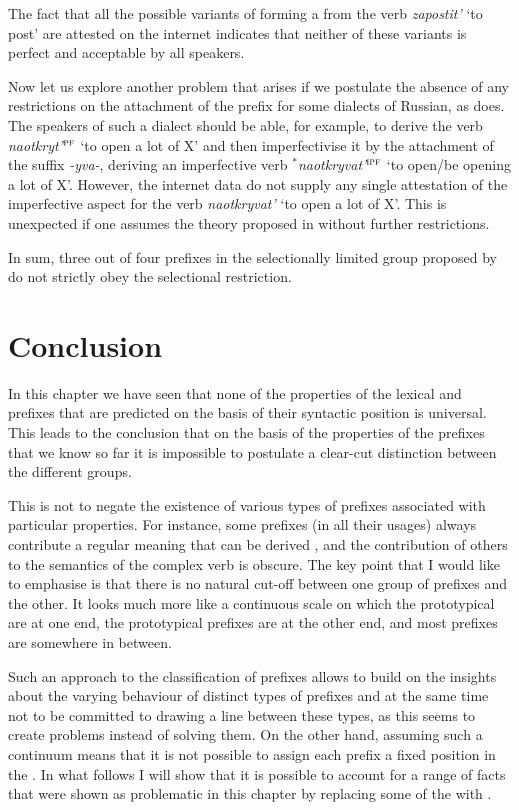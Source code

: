 The fact that all the possible variants of forming a  from the verb \textit{zapostit'} `to post' are attested on the internet indicates that neither of these variants is perfect and acceptable by all speakers.

Now let us explore another problem that arises if we postulate the absence of any restrictions on the attachment of the prefix  for some dialects of Russian, as \citet{Tatevosov:13a} does. The speakers of such a dialect should be able, for example, to derive the verb \textit{naotkryt'}$^{\textsc{pf}}$ `to open a lot of X' and then imperfectivise it by the attachment of the suffix \textit{-yva-}, deriving an imperfective verb $^*$\textit{naotkryvat'}$^{\textsc{ipf}}$ `to open/be opening a lot of X'. However, the internet data do not supply any single attestation of the imperfective aspect for the verb \textit{naotkryvat'} `to open a lot of X'. This is unexpected if one assumes the theory proposed in \citet{Tatevosov:13a} without further restrictions.

In sum, three out of four prefixes in the selectionally limited group proposed by \citet{Tatevosov:09} do not strictly obey the selectional restriction. 

\section{Conclusion}\label{section:new:conclusion}
In this chapter we have seen that none of the properties of the lexical and  prefixes that are predicted on the basis of their syntactic position is universal. This leads to the conclusion that on the basis of the properties of the prefixes that we know so far it is impossible to postulate a clear-cut distinction between the different groups. 

This is not to negate the existence of various types of prefixes associated with particular properties. For instance, some prefixes (in all their usages) always contribute a regular meaning that can be derived , and the contribution of others to the semantics of the complex verb is obscure. The key point that I would like to emphasise is that there is no natural cut-off between one group of prefixes and the other. It looks much more like a continuous scale on which the prototypical  are at one end, the prototypical  prefixes are at the other end, and most prefixes are somewhere in between. 

Such an approach to the classification of prefixes allows to build on the insights about the varying behaviour of distinct types of prefixes and at the same time not to be committed to drawing a line between these types, as this seems to create problems instead of solving them. On the other hand, assuming such a continuum means that it is not possible to assign each prefix a fixed position in the . In what follows I will show that it is possible to account for a range of facts that were shown as problematic in this chapter by replacing some of the  with .
